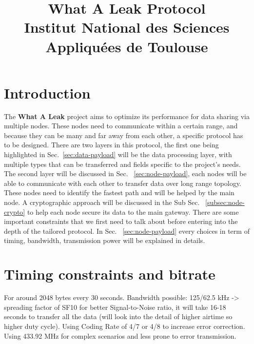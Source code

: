 \documentclass[9pt,conference]{IEEEtran}
\begin{document}
\title{What A Leak Protocol \\Institut National des Sciences Appliquées de Toulouse}
\author{
}
\maketitle

\section{Introduction}
The \textbf{What A Leak} project aims to optimize its performance for data sharing via multiple nodes. These nodes need to communicate within a certain range, and because they can be many and far away from each other, a specific protocol has to be designed. There are two layers in this protocol, the first one being highlighted in Sec.~\ref{sec:data-payload} will be the data processing layer, with multiple types that can be transferred and fields specific to the project's needs. The second layer will be discussed in Sec. ~\ref{sec:node-payload}, each nodes will be able to communicate with each other to transfer data over long range topology. These nodes need to identify the fastest path and will be helped by the main node. A cryptographic approach will be discussed in the Sub Sec. ~\ref{subsec:node-crypto} to help each node secure its data to the main gateway. There are some important constraints that we first need to talk about before entering into the depth of the tailored protocol. In Sec. ~\ref{sec:node-payload} every choices in term of timing, bandwidth, transmission power will be explained in details.

\section{Timing constraints and bitrate} \label{sec:constraints}
For around 2048 bytes every 30 seconds.
Bandwidth possible: 125/62.5 kHz -> spreading factor of SF10 for better Signal-to-Noise ratio, it will take 16-18 seconds to transfer all the data (will look into the detail of higher airtime so higher duty cycle). Using Coding Rate of 4/7 or 4/8 to increase error correction. Using 433.92 MHz for complex scenarios and less prone to error transmission.
\end{document}
